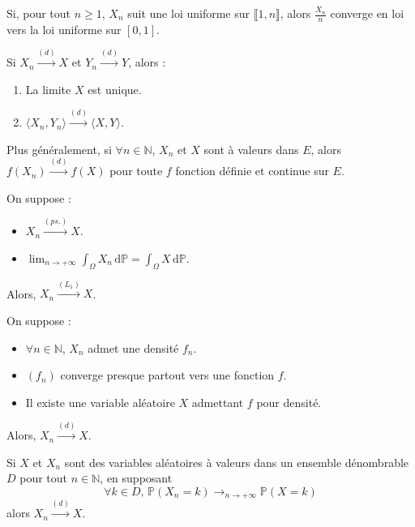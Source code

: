 
  \begin{example}
    Si, pour tout $n \geq 1$, $X_n$ suit une loi uniforme sur $\llbracket 1, n \rrbracket$, alors $\frac{X_n}{n}$ converge en loi vers la loi uniforme sur $[0,1]$.
  \end{example}


  \begin{proposition}
    Si $X_n \overset{(d)}{\longrightarrow} X$ et $Y_n \overset{(d)}{\longrightarrow} Y$, alors :
    \begin{enumerate}[label={\bfseries(\roman*)}]
      \item La limite $X$ est unique.
      \item $\langle X_n, Y_n \rangle \overset{(d)}{\longrightarrow} \langle X, Y \rangle$.
    \end{enumerate}
    Plus généralement, si $\forall n \in \mathbb{N}$, $X_n$ et $X$ sont à valeurs dans $E$, alors $f(X_n) \overset{(d)}{\longrightarrow} f(X)$ pour toute $f$ fonction définie et continue sur $E$.
  \end{proposition}

  \begin{theorem}
    On suppose :
    \begin{itemize}
      \item $X_n \overset{(ps.)}{\longrightarrow} X$.
      \item $\lim_{n \rightarrow +\infty} \int_\Omega X_n \, \mathrm{d}\mathbb{P} = \int_\Omega X \, \mathrm{d}\mathbb{P}$.
    \end{itemize}
    Alors, $X_n \overset{(L_1)}{\longrightarrow} X$.
  \end{theorem}

  \begin{corollary}
    On suppose :
    \begin{itemize}
      \item $\forall n \in \mathbb{N}$, $X_n$ admet une densité $f_n$.
      \item $(f_n)$ converge presque partout vers une fonction $f$.
      \item Il existe une variable aléatoire $X$ admettant $f$ pour densité.
    \end{itemize}
    Alors, $X_n \overset{(d)}{\longrightarrow} X$.
  \end{corollary}

  \begin{corollary}
    Si $X$ et $X_n$ sont des variables aléatoires à valeurs dans un ensemble dénombrable $D$ pour tout $n \in \mathbb{N}$, en supposant
    \[ \forall k \in D, \, \mathbb{P}(X_n = k) \longrightarrow_{n\rightarrow+\infty} \mathbb{P}(X = k) \]
    alors $X_n \overset{(d)}{\longrightarrow} X$.
  \end{corollary}

